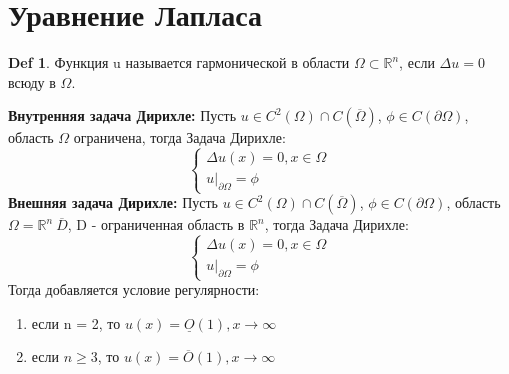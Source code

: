 \documentclass[14pt]{article}
\theoremstyle{plain}
\theoremstyle{definition}
\newtheorem{Def}{Def}
\begin{document}
	\section{Уравнение Лапласа}
		\begin{Def}
			Функция u называется гармонической в области $\Omega \subset \mathbb{R}^n$, если $\Delta u =0$ всюду в $\Omega$.
		\end{Def}
		\textbf{Внутренняя задача Дирихле:}
		Пусть $u \in C^2(\Omega) \cap C(\overline{\Omega})$, $\phi \in C(\partial \Omega)$, область $\Omega$ ограничена, тогда Задача Дирихле:
		\begin{equation*}
			\left\{ 
			\begin{array}{ll} 
				\Delta u(x) = 0, x\in \Omega \\
				u|_{\partial \Omega} = \phi \end{array}\right.
		\end{equation*}
		\textbf{Внешняя задача Дирихле:}
			Пусть $u \in C^2(\Omega) \cap C(\overline{\Omega})$, $\phi \in C(\partial \Omega)$, область $\Omega = \mathbb{R}^n \ \overline{D}$, D - ограниченная область в $\mathbb{R}^n$, тогда Задача Дирихле:
			\begin{equation*}
				\left\{ 
				\begin{array}{ll} 
					\Delta u(x) = 0, x\in \Omega \\
					u|_{\partial \Omega} = \phi \end{array}\right.
			\end{equation*}
		Тогда добавляется условие регулярности:
		\begin{enumerate}
			\item если n = 2, то $u(x) = \underline{O}(1), x \to \infty$
			\item если $n \geq 3$, то $u(x) = \overline{O}(1), x \to \infty$
		\end{enumerate}
		
\end{document}
